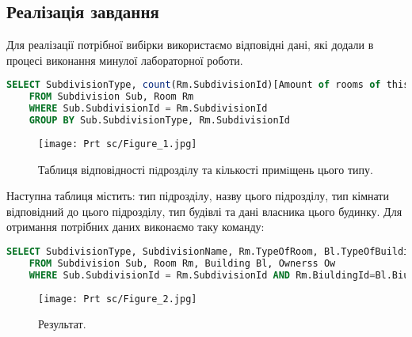 \documentclass[a4paper,12pt]{article}
\begin{document}
\newpage
	\begin{center}
		\section*{\bfseries{Реалізація завдання}}
	\end{center}

    Для реалізації потрібної вибірки використаємо відповідні дані, 
    які додали в процесі виконання минулої лабораторної роботи. \\
    \begin{lstlisting}[language=SQL]
    SELECT SubdivisionType, count(Rm.SubdivisionId)[Amount of rooms of this type]
    FROM Subdivision Sub, Room Rm
    WHERE Sub.SubdivisionId = Rm.SubdivisionId
    GROUP BY Sub.SubdivisionType, Rm.SubdivisionId
    \end{lstlisting}
    \begin{figure}[h!]
		\begin{minipage}[h]{1\linewidth}
            \centering
			\texttt{[image: Prt sc/Figure\_1.jpg]}  
		\end{minipage}
		\caption{Таблиця відповідності пiдроздiлу та кількості примiщень цього типу.}
	\end{figure}

    Наступна таблиця містить: тип підрозділу, назву цього підрозділу, тип кімнати відповідний
    до цього підрозділу, тип будівлі та дані власника цього будинку. Для отримання потрібних
    даних виконаємо таку команду:
    \begin{lstlisting}[language=SQL]
    SELECT SubdivisionType, SubdivisionName, Rm.TypeOfRoom, Bl.TypeOfBuilding, Ow.FirstName, Ow.LastName
    FROM Subdivision Sub, Room Rm, Building Bl, Ownerss Ow
    WHERE Sub.SubdivisionId = Rm.SubdivisionId AND Rm.BiuldingId=Bl.BiuldingId AND Bl.IdOwner=Ow.OwnerId
    \end{lstlisting}

\newpage
    \begin{figure}[h!]
		\begin{minipage}[h]{1\linewidth}
            \centering
			\texttt{[image: Prt sc/Figure\_2.jpg]}  
		\end{minipage}
		\caption{Результат.}
	\end{figure}
    
\end{document}
